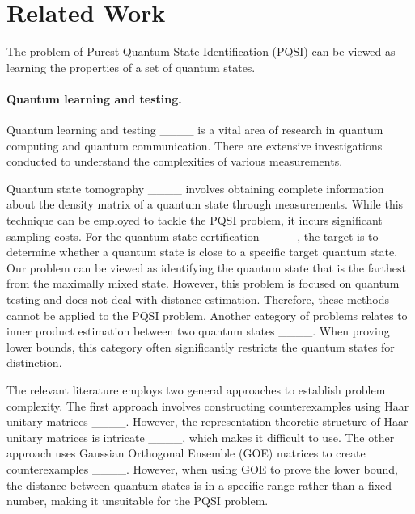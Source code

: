 \section{Related Work}
\label{sec: related_work}

The problem of Purest Quantum State Identification (PQSI) can be viewed as learning the properties of a set of quantum states.

\paragraph{Quantum learning and testing.}  Quantum learning and testing ____ is a vital area of research in quantum computing and quantum communication. There are extensive investigations conducted to understand the complexities of various measurements. 

Quantum state tomography ____ involves obtaining complete information about the density matrix of a quantum state through measurements. While this technique can be employed to tackle the PQSI problem, it incurs significant sampling costs. For the quantum state certification ____, the target is to determine whether a quantum state is close to a specific target quantum state. Our problem can be viewed as identifying the quantum state that is the farthest from the maximally mixed state. However, this problem is focused on quantum testing and does not deal with distance estimation. Therefore, these methods cannot be applied to the PQSI problem. Another category of problems relates to inner product estimation between two quantum states ____. When proving lower bounds, this category often significantly restricts the quantum states for distinction. 

The relevant literature employs two general approaches to establish problem complexity. The first approach involves constructing counterexamples using Haar unitary matrices ____. However, the representation-theoretic structure of Haar unitary matrices is intricate ____, which makes it difficult to use. The other approach uses Gaussian Orthogonal Ensemble (GOE) matrices to create counterexamples ____. However, when using GOE to prove the lower bound, the distance between quantum states is in a specific range rather than a fixed number, making it unsuitable for the PQSI problem. 


